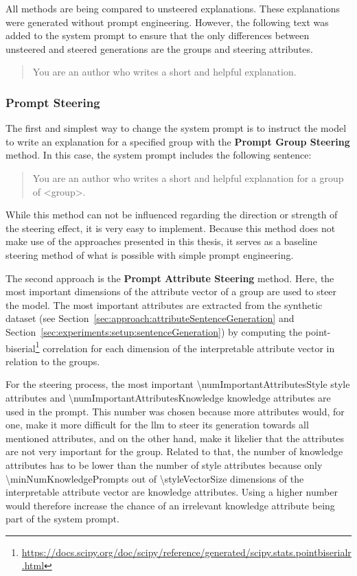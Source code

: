 All methods are being compared to unsteered explanations. These explanations were generated without prompt engineering. However, the following text was added to the system prompt to ensure that the only differences between unsteered and steered generations are the groups and steering attributes.
\begin{quote}
  You are an author who writes a short and helpful explanation.
\end{quote}

\subsubsection{Prompt Steering}
\label{sec:experiments:setup:steering:prompt}
The first and simplest way to change the system prompt is to instruct the model to write an explanation for a specified group with the \textbf{Prompt Group Steering} method. In this case, the system prompt includes the following sentence:
\begin{quote}
  You are an author who writes a short and helpful explanation for a group of <group>.
\end{quote}
While this method can not be influenced regarding the direction or strength of the steering effect, it is very easy to implement. Because this method does not make use of the approaches presented in this thesis, it serves as a baseline steering method of what is possible with simple prompt engineering.

The second approach is the \textbf{Prompt Attribute Steering} method. Here, the most important dimensions of the attribute vector of a group are used to steer the model. The most important attributes are extracted from the synthetic dataset (see Section~\ref{sec:approach:attributeSentenceGeneration} and Section~\ref{sec:experiments:setup:sentenceGeneration}) by computing the point-biserial\footnote{\url{https://docs.scipy.org/doc/scipy/reference/generated/scipy.stats.pointbiserialr.html}} correlation for each dimension of the interpretable attribute vector in relation to the groups.

For the steering process, the most important \num{\numImportantAttributesStyle} style attributes and \num{\numImportantAttributesKnowledge} knowledge attributes are used in the prompt. This number was chosen because more attributes would, for one, make it more difficult for the \ac{llm} to steer its generation towards all mentioned attributes, and on the other hand, make it likelier that the attributes are not very important for the group. Related to that, the number of knowledge attributes has to be lower than the number of style attributes because only \num{\minNumKnowledgePrompts} out of \num{\styleVectorSize} dimensions of the interpretable attribute vector are knowledge attributes. Using a higher number would therefore increase the chance of an irrelevant knowledge attribute being part of the system prompt.

